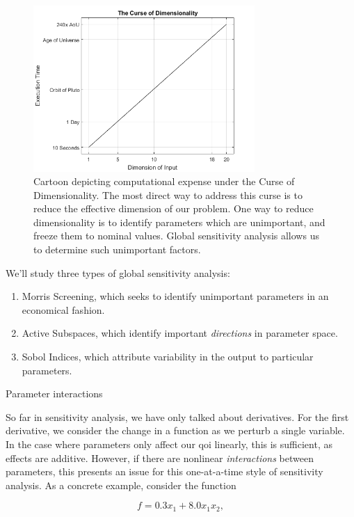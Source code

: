 \documentclass[../primer.tex]{subfiles}
\begin{document}
\begin{figure}[!ht]
  \centering
  \includegraphics[width=0.75\textwidth]{./images/curse_of_dimensionality}
  \caption{Cartoon depicting computational expense under the Curse of Dimensionality.
  The most direct way to address this curse is to reduce the effective dimension
  of our problem. One way to reduce dimensionality is to identify parameters
  which are unimportant, and freeze them to nominal values. Global sensitivity
  analysis allows us to determine such unimportant factors.}
  \label{fig:curse}
\end{figure}

We'll study three types of global sensitivity analysis:
\begin{enumerate}
\item Morris Screening, which seeks to identify unimportant parameters in an economical fashion.
\item Active Subspaces, which identify important \emph{directions} in parameter space.
\item Sobol Indices, which attribute variability in the output to particular parameters.
\end{enumerate}

Parameter interactions

So far in sensitivity analysis, we have only talked about derivatives. For the
first derivative, we consider the change in a function as we perturb a single
variable. In the case where parameters only affect our qoi linearly, this is
sufficient, as effects are additive. However, if there are nonlinear
\emph{interactions} between parameters, this presents an issue for this one-at-a-time
style of sensitivity analysis. As a concrete example, consider the function

\begin{equation}
  f = 0.3 x_1 + 8.0 x_1 x_2,
\end{equation}
\end{document}
